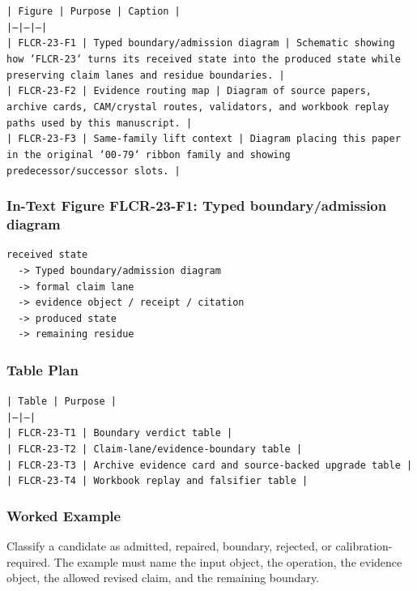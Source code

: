 \documentclass[11pt]{article}
\begin{document}
\noindent\texttt{| Figure | Purpose | Caption |}\\
\noindent\texttt{|---|---|---|}\\
\noindent\texttt{| FLCR-23-F1 | Typed boundary/admission diagram | Schematic showing how `FLCR-23` turns its received state into the produced state while preserving claim lanes and residue boundaries. |}\\
\noindent\texttt{| FLCR-23-F2 | Evidence routing map | Diagram of source papers, archive cards, CAM/crystal routes, validators, and workbook replay paths used by this manuscript. |}\\
\noindent\texttt{| FLCR-23-F3 | Same-family lift context | Diagram placing this paper in the original `00-79` ribbon family and showing predecessor/successor slots. |}\\

\subsubsection*{In-Text Figure FLCR-23-F1: Typed boundary/admission diagram}

\begin{verbatim}
received state
  -> Typed boundary/admission diagram
  -> formal claim lane
  -> evidence object / receipt / citation
  -> produced state
  -> remaining residue
\end{verbatim}

\subsubsection*{Table Plan}

\noindent\texttt{| Table | Purpose |}\\
\noindent\texttt{|---|---|}\\
\noindent\texttt{| FLCR-23-T1 | Boundary verdict table |}\\
\noindent\texttt{| FLCR-23-T2 | Claim-lane/evidence-boundary table |}\\
\noindent\texttt{| FLCR-23-T3 | Archive evidence card and source-backed upgrade table |}\\
\noindent\texttt{| FLCR-23-T4 | Workbook replay and falsifier table |}\\

\subsubsection*{Worked Example}

Classify a candidate as admitted, repaired, boundary, rejected, or calibration-required. The example must name the input object, the operation,
the evidence object, the allowed revised claim, and the remaining boundary.
\end{document}
